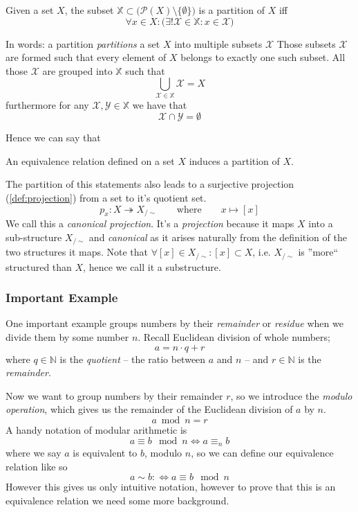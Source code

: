 \begin{definition}[Partition]
   Given a set \(X\), the subset \(\mathbb{X} \subset \big(\mathcal{P}(X) \setminus \{\emptyset\}\big)\) is a partition of \(X\) iff
   \[\forall x \in X: \big(\exists! \mathcal{X} \in \mathbb{X}: x \in \mathcal{X}\big)\]
\end{definition}
\begin{remark}[Intuition]
   In words: a partition \emph{partitions} a set \(X\) into multiple subsets \(\mathcal{X}\)
   Those subsets \(\mathcal{X}\) are formed such that every element of \(X\) belongs to exactly one such subset.
   All those \(\mathcal{X}\) are grouped into \(\mathbb{X}\) such that
   \[\bigcup_{\mathcal{X} \in \mathbb{X}} \mathcal{X} = X\]
   furthermore for any \(\mathcal{X}, \mathcal{Y} \in \mathbb{X}\) we have that
   \[\mathcal{X} \cap \mathcal{Y} = \emptyset\]
\end{remark}

Hence we can say that
\begin{theorem}\label{thm:equivcls}
   An equivalence relation defined on a set \(X\) induces a partition of \(X\).
\end{theorem}
The partition of this statements also leads to a surjective projection (\ref{def:projection}) from a set to it's quotient set.
\[p_x: X \twoheadrightarrow X_{/\sim} \qquad\text{where}\qquad x \mapsto [x]\]
We call this a \emph{canonical projection}.
It's a \emph{projection} because it maps \(X\) into a sub-structure \(X_{/\sim}\) and \emph{canonical} as it arises naturally from the definition of the two structures it maps.
Note that \(\forall [x] \in X_{/\sim}: [x] \subset X\), i.e. \(X_{/\sim}\) is ''more`` structured than \(X\), hence we call it a substructure.

\subsubsection{Important Example}
One important example groups numbers by their \emph{remainder} or \emph{residue} when we divide them by some number \(n\).
Recall Euclidean division of whole numbers;
\[a = n \cdot q + r\]
where \(q \in \mathbb{N}\) is the \emph{quotient} -- the ratio between \(a\) and \(n\) -- and \(r \in \mathbb{N}\) is the \emph{remainder}.

Now we want to group numbers by their remainder \(r\), so we introduce the \emph{modulo operation}, which gives us the remainder of the Euclidean division of \(a\) by \(n\).
\[a \bmod n = r\]
A handy notation of modular arithmetic is
\[a \equiv b \mod n \iff a \equiv_n b\]
where we say \(a\) is equivalent to \(b\), modulo \(n\), so we can define our equivalence relation like so
\[a \sim b :\iff a \equiv b \mod n\]
However this gives us only intuitive notation, however to prove that this is an equivalence relation we need some more background.

